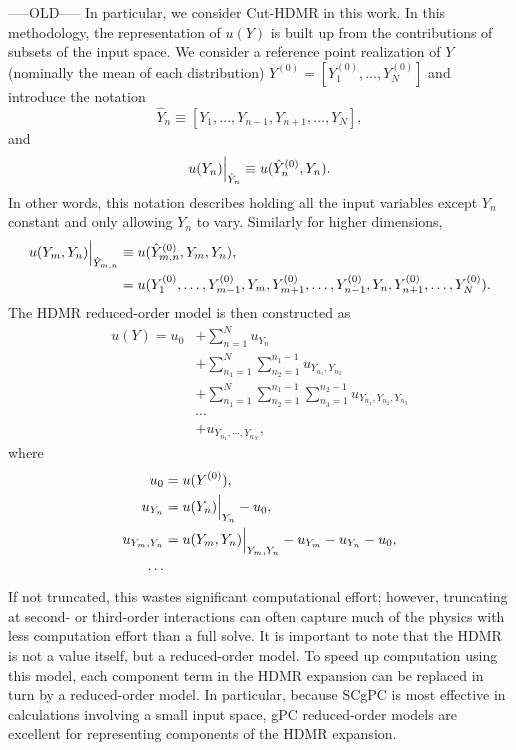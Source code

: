 -----OLD-----
In particular, we consider Cut-HDMR in this work.  
In this methodology, the representation of $u(Y)$ is built up from the contributions of subsets of the input
space.  We consider a reference point realization of $Y$ (nominally the mean of each distribution) $Y^{(0)} =
[Y_1^{(0)},\ldots,Y_N^{(0)}]$ and introduce the notation
\begin{equation}
  \hat Y_n \equiv [Y_1,\ldots,Y_{n-1},Y_{n+1},\ldots,Y_N],
\end{equation}
and
\begin{equation}
  u(Y_n)\Big|_{\hat Y_n} \equiv u(\hat Y_n^{(0)},Y_n).
\end{equation}
In other words, this notation describes holding all the input variables except $Y_n$ constant and only allowing
$Y_n$ to vary.  Similarly for higher dimensions,
\begin{align}
  u(Y_m,Y_n)\Big|_{\hat Y_{m,n}} &\equiv u(\hat Y_{m,n}^{(0)},Y_m,Y_n),\\
      &=
      u(Y_1^{(0)},\ldots,Y_{m-1}^{(0)},Y_m,Y_{m+1}^{(0)},\ldots,Y_{n-1}^{(0)},Y_n,Y_{n+1}^{(0)},\ldots,Y_N^{(0)}).
\end{align}
The HDMR reduced-order model is then constructed as
\begin{align}
  u(Y) = u_0 &+ \sum_{n=1}^N u_{Y_n} \nonumber\\
  &+ \sum_{n_1=1}^N \sum_{n_2=1}^{n_1-1} u_{Y_{n_1},Y_{n_2}} \nonumber \\
  &+ \sum_{n_1=1}^N \sum_{n_2=1}^{n_1-1} \sum_{n_3=1}^{n_2-1} u_{Y_{n_1},Y_{n_2},Y_{n_3}} \nonumber \\
  &\cdots\\
  &+u_{Y_{n_1},\cdots,Y_{n_N}},
\end{align}
where
\begin{align}
  u_0 &= u(Y^{(0)}),\\
  u_{Y_n} &= u(Y_n)\Big|_{Y_n} - u_0,\\
  u_{Y_m,Y_n} &= u(Y_m,Y_n)\Big|_{Y_m,Y_n} - u_{Y_m} - u_{Y_n} - u_0,\\
  \cdots&
\end{align}
If not truncated, this wastes significant computational effort; however, truncating at second- or third-order
interactions can often capture much of the physics with less computation effort than a full solve.  It is
important to note that the HDMR is not a value itself, but a reduced-order model.  To speed up computation
using this model, each component term in the HDMR expansion can be replaced in turn by a reduced-order model.
In particular, because SCgPC is most effective in calculations involving a small input space, gPC
reduced-order models are excellent for representing components of the HDMR expansion.

